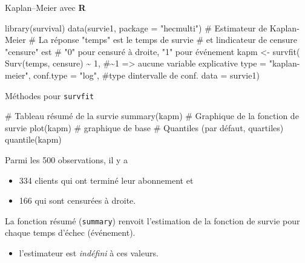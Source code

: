 \documentclass[
  ignorenonframetext,
]{beamer}
\newenvironment{Shaded}{\begin{snugshade}}{\end{snugshade}}
\newcommand{\AttributeTok}[1]{\textcolor[rgb]{0.40,0.45,0.13}{#1}}
\newcommand{\CommentTok}[1]{\textcolor[rgb]{0.37,0.37,0.37}{#1}}
\newcommand{\DecValTok}[1]{\textcolor[rgb]{0.68,0.00,0.00}{#1}}
\newcommand{\FunctionTok}[1]{\textcolor[rgb]{0.28,0.35,0.67}{#1}}
\newcommand{\NormalTok}[1]{\textcolor[rgb]{0.00,0.23,0.31}{#1}}
\newcommand{\OtherTok}[1]{\textcolor[rgb]{0.00,0.23,0.31}{#1}}
\newcommand{\SpecialCharTok}[1]{\textcolor[rgb]{0.37,0.37,0.37}{#1}}
\newcommand{\StringTok}[1]{\textcolor[rgb]{0.13,0.47,0.30}{#1}}
\providecommand{\tightlist}{%
  \setlength{\itemsep}{0pt}\setlength{\parskip}{0pt}}\usepackage{longtable,booktabs,array}
\begin{document}
\begin{frame}[fragile]{Kaplan--Meier avec \textbf{R}}
\protect\hypertarget{kaplanmeier-avec-r}{}
\begin{Shaded}
\begin{Highlighting}[numbers=left,,]
\FunctionTok{library}\NormalTok{(survival)}
\FunctionTok{data}\NormalTok{(survie1, }\AttributeTok{package =} \StringTok{"hecmulti"}\NormalTok{)}
\CommentTok{\# Estimateur de Kaplan{-}Meier}
\CommentTok{\# La réponse "temps" est le temps de survie }
\CommentTok{\# et l\textquotesingle{}indicateur de censure "censure" est}
\CommentTok{\# "0" pour censuré à droite, "1" pour événement}
\NormalTok{kapm }\OtherTok{\textless{}{-}} \FunctionTok{survfit}\NormalTok{(}
  \FunctionTok{Surv}\NormalTok{(temps, censure) }\SpecialCharTok{\textasciitilde{}} \DecValTok{1}\NormalTok{, }
  \CommentTok{\#\textasciitilde{}1 =\textgreater{} aucune variable explicative}
  \AttributeTok{type =} \StringTok{"kaplan{-}meier"}\NormalTok{, }
  \AttributeTok{conf.type =} \StringTok{"log"}\NormalTok{, }\CommentTok{\#type d\textquotesingle{}intervalle de conf.}
  \AttributeTok{data =}\NormalTok{ survie1)}
\end{Highlighting}
\end{Shaded}
\end{frame}

\begin{frame}[fragile]{Méthodes pour \texttt{survfit}}
\protect\hypertarget{muxe9thodes-pour-survfit}{}
\begin{Shaded}
\begin{Highlighting}[numbers=left,,]
\CommentTok{\# Tableau résumé de la survie}
\FunctionTok{summary}\NormalTok{(kapm)  }
\CommentTok{\# Graphique de la fonction de survie}
\FunctionTok{plot}\NormalTok{(kapm) }\CommentTok{\# graphique de base}
\CommentTok{\# Quantiles (par défaut, quartiles)}
\FunctionTok{quantile}\NormalTok{(kapm)}
\end{Highlighting}
\end{Shaded}

Parmi les 500 observations, il y a

\begin{itemize}
\tightlist
\item
  334 clients qui ont terminé leur abonnement et
\item
  166 qui sont censurées à droite.
\end{itemize}

La fonction résumé (\texttt{summary}) renvoit l'estimation de la
fonction de survie pour chaque temps d'échec (événement).

\begin{itemize}
\tightlist
\item
  l'estimateur est \emph{indéfini} à ces valeurs.
\end{itemize}
\end{frame}
\end{document}
